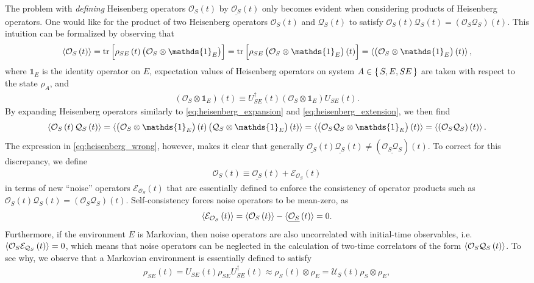\documentclass[aps,pra,twocolumn,longbibliography]{revtex4-2}
\newcommand{\p}[1]{\left( #1 \right)} %
\renewcommand{\sp}[1]{\left[ #1 \right]} %
\newcommand{\bk}{\braket} %
\newcommand{\ul}{\underline} %
\newcommand{\E}{\mathcal{E}}
\renewcommand{\O}{\mathcal{O}}
\newcommand{\Q}{\mathcal{Q}}
\newcommand{\U}{\mathcal{U}}
\newcommand{\1}{\mathds{1}}
\begin{document}
The problem with {\it defining} Heisenberg operators $\O_S\p{t}$ by
$\ul{\O_S}\p{t}$ only becomes evident when considering products of
Heisenberg operators.  One would like for the product of two
Heisenberg operators $\O_S\p{t}$ and $\Q_S\p{t}$ to satisfy
$\O_S\p{t}\Q_S\p{t}=\p{\O_S\Q_S}\p{t}$.  This intuition can be
formalized by observing that
\begin{align}
  \bk{\O_S\p{t}}
  = \tr\sp{\rho_{SE}\p{t} \p{\O_S\otimes\1_E}}
  = \tr\sp{\rho_{SE} \p{\O_S\otimes\1_E}\p{t}}
  = \bk{\p{\O_S\otimes\1_E}\p{t}},
  \label{eq:heisenberg_expansion}
\end{align}
where $\1_E$ is the identity operator on $E$, expectation values of
Heisenberg operators on system $A\in\set{S,E,SE}$ are taken with
respect to the state $\rho_A$, and
\begin{align}
  \p{\O_S\otimes\1_E}\p{t}
  \equiv U_{SE}^\dag\p{t} \p{\O_S\otimes\1_E} U_{SE}\p{t}.
  \label{eq:heisenberg_extension}
\end{align}
By expanding Heisenberg operators similarly to
\eqref{eq:heisenberg_expansion} and \eqref{eq:heisenberg_extension},
we then find
\begin{align}
  \bk{\O_S\p{t}\Q_S\p{t}}
  = \bk{\p{\O_S\otimes\1_E}\p{t} \p{\Q_S\otimes\1_E}\p{t}}
  = \bk{\p{\O_S\Q_S\otimes\1_E}\p{t}}
  = \bk{\p{\O_S\Q_S}\p{t}}.
\end{align}
The expression in \eqref{eq:heisenberg_wrong}, however, makes it clear
that generally
$\ul{\O_S}\p{t} \ul{\Q_S}\p{t}\ne\p{\ul{\O_S\Q_S}}\p{t}$.  To correct
for this discrepancy, we define
\begin{align}
  \O_S\p{t} \equiv \ul{\O_S}\p{t} + \E_{\O_S}\p{t}
  \label{eq:noise_def}
\end{align}
in terms of new ``noise'' operators $\E_{\O_S}\p{t}$ that are
essentially defined to enforce the consistency of operator products
such as $\O_S\p{t}\Q_S\p{t}=\p{\O_S\Q_S}\p{t}$. Self-consistency
forces noise operators to be mean-zero, as
\begin{align}
  \bk{\E_{\O_S}\p{t}} = \bk{\O_S\p{t}} - \bk{\ul{\O_S}\p{t}} = 0.
\end{align}
Furthermore, if the environment $E$ is Markovian, then noise operators
are also uncorrelated with initial-time observables,
i.e.~$\bk{\O_S\E_{\Q_S}\p{t}}=0$, which means that noise operators can
be neglected in the calculation of two-time correlators of the form
$\bk{\O_S\Q_S\p{t}}$.  To see why, we observe that a Markovian
environment is essentially defined to satisfy
\begin{align}
  \rho_{SE}\p{t} = U_{SE}\p{t} \rho_{SE} U_{SE}^\dag\p{t}
  \approx \rho_S\p{t}\otimes\rho_E
  = \U_{\ul S}\p{t} \rho_S\otimes\rho_E,
  \label{eq:markov}
\end{align}
\end{document}
